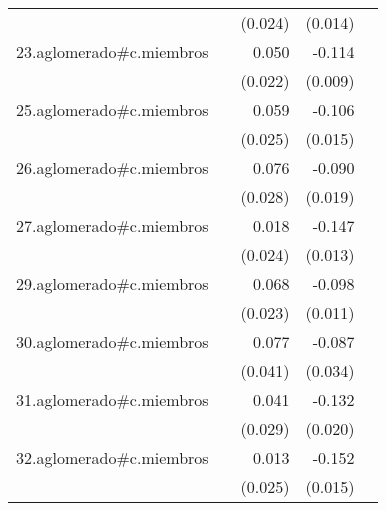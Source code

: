 {\begin{longtable}{l*{4}{D{.}{.}{-1}}}
            &                     &     (0.024)         &     (0.014)         &                     \\
\addlinespace
23.aglomerado#c.miembros&                     &       0.050\sym{*}  &      -0.114\sym{***}&                     \\
            &                     &     (0.022)         &     (0.009)         &                     \\
\addlinespace
25.aglomerado#c.miembros&                     &       0.059\sym{*}  &      -0.106\sym{***}&                     \\
            &                     &     (0.025)         &     (0.015)         &                     \\
\addlinespace
26.aglomerado#c.miembros&                     &       0.076\sym{**} &      -0.090\sym{***}&                     \\
            &                     &     (0.028)         &     (0.019)         &                     \\
\addlinespace
27.aglomerado#c.miembros&                     &       0.018         &      -0.147\sym{***}&                     \\
            &                     &     (0.024)         &     (0.013)         &                     \\
\addlinespace
29.aglomerado#c.miembros&                     &       0.068\sym{**} &      -0.098\sym{***}&                     \\
            &                     &     (0.023)         &     (0.011)         &                     \\
\addlinespace
30.aglomerado#c.miembros&                     &       0.077         &      -0.087\sym{**} &                     \\
            &                     &     (0.041)         &     (0.034)         &                     \\
\addlinespace
31.aglomerado#c.miembros&                     &       0.041         &      -0.132\sym{***}&                     \\
            &                     &     (0.029)         &     (0.020)         &                     \\
\addlinespace
32.aglomerado#c.miembros&                     &       0.013         &      -0.152\sym{***}&                     \\
            &                     &     (0.025)         &     (0.015)         &                     \\

\end{longtable}}
